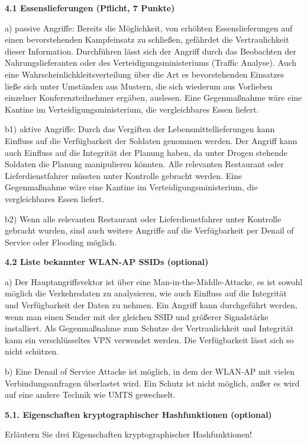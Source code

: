 \documentclass[ngerman]{fbi-aufgabenblatt}
\begin{document}
\textbf{4.1 Essenslieferungen (Pflicht, 7 Punkte)}

a) passive Angriffe: Bereits die Möglichkeit, von erhöhten Essenslieferungen auf einen bevorstehenden Kampfeinsatz zu schließen, gefährdet die Vertraulichkeit dieser Information. Durchführen lässt sich der Angriff durch das Beobachten der Nahrungslieferanten oder des Verteidigungsministeriums (Traffic Analyse). Auch eine Wahrscheinlichkleitsverteilung über die Art es bevorstehenden Einsatzes ließe sich unter Umständen aus Mustern, die sich wiederum aus Vorlieben einzelner Konferenzteilnehmer ergäben, auslesen. Eine Gegenmaßnahme wäre eine Kantine im Verteidigungsministerium, die vergleichbares Essen liefert. 

b1) aktive Angriffe: Durch das Vergiften der Lebensmittellieferungen kann Einfluss auf die Verfügbarkeit der Soldaten genommen werden. Der Angriff kann auch Einfluss auf die Integrität der Planung haben, da unter Drogen stehende Soldaten die Planung manipulieren könnten. Alle relevanten Restaurant oder Lieferdienstfahrer müssten unter Kontrolle gebracht werden. Eine Gegenmaßnahme wäre eine Kantine im Verteidigungsministerium, die vergleichbares Essen liefert.
 
b2) Wenn alle relevanten Restaurant oder Lieferdienstfahrer unter Kontrolle gebracht wurden, sind auch weitere Angriffe auf die Verfügbarkeit per Denail of Service oder Flooding möglich.

\textbf{4.2 Liste bekannter WLAN-AP SSIDs (optional)}

a) Der Hauptangriffsvektor ist über eine Man-in-the-Middle-Attacke, es ist sowohl möglich die Verkehrsdaten zu analysieren, wie auch Einfluss auf die Integrität und Verfügbarkeit der Daten zu nehmen. Ein Angriff kann durchgeführt werden, wenn man einen Sender mit der gleichen SSID und größerer Signalstärke installiert.
Als Gegenmaßnahme zum Schutze der Vertraulichkeit und Integrität kann ein verschlüsseltes VPN verwendet werden. Die Verfügbarkeit lässt sich so nicht schützen.

b) Eine Denail of Service Attacke ist möglich, in dem der WLAN-AP mit vielen Verbindungsanfragen überlastet wird. Ein Schutz ist nicht möglich, außer es wird auf eine andere Technik wie UMTS gewechselt. 


\newpage
{}

\textbf{5.1. Eigenschaften kryptographischer Hashfunktionen (optional)}

Erläutern Sie drei Eigenschaften kryptographischer Hashfunktionen!
\end{document}
